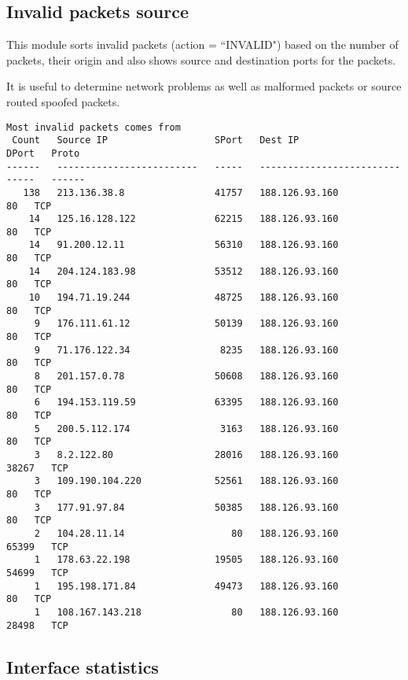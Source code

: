 \documentclass[english,twoside,openright,a4paper,12pt]{article}
\begin{document}
\subsection{Invalid packets source}

This module sorts invalid packets (action = ``INVALID") based on the
number of packets, their origin and also shows source and destination
ports for the packets.

It is useful to determine network problems as well as malformed
packets or source routed spoofed packets.

\scriptsize 
\begin{verbatim}
Most invalid packets comes from
 Count   Source IP                   SPort   Dest IP                     DPort   Proto    
------   -------------------------   -----   -------------------------   -----   ------   
   138   213.136.38.8                41757   188.126.93.160                 80   TCP      
    14   125.16.128.122              62215   188.126.93.160                 80   TCP      
    14   91.200.12.11                56310   188.126.93.160                 80   TCP      
    14   204.124.183.98              53512   188.126.93.160                 80   TCP      
    10   194.71.19.244               48725   188.126.93.160                 80   TCP      
     9   176.111.61.12               50139   188.126.93.160                 80   TCP      
     9   71.176.122.34                8235   188.126.93.160                 80   TCP      
     8   201.157.0.78                50608   188.126.93.160                 80   TCP      
     6   194.153.119.59              63395   188.126.93.160                 80   TCP      
     5   200.5.112.174                3163   188.126.93.160                 80   TCP      
     3   8.2.122.80                  28016   188.126.93.160              38267   TCP      
     3   109.190.104.220             52561   188.126.93.160                 80   TCP      
     3   177.91.97.84                50385   188.126.93.160                 80   TCP      
     2   104.28.11.14                   80   188.126.93.160              65399   TCP      
     1   178.63.22.198               19505   188.126.93.160              54699   TCP      
     1   195.198.171.84              49473   188.126.93.160                 80   TCP      
     1   108.167.143.218                80   188.126.93.160              28498   TCP      
\end{verbatim} 
\normalsize

\subsection{Interface statistics}
\end{document}
